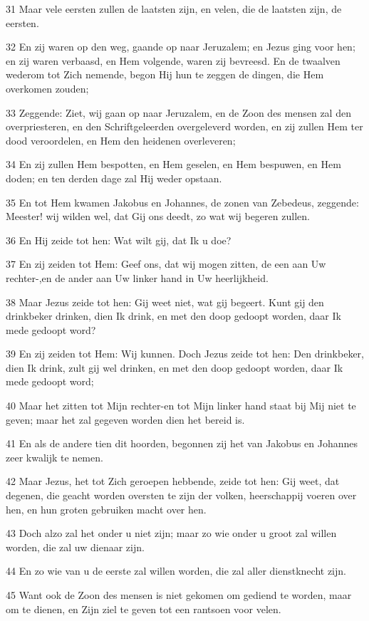 \par 31 Maar vele eersten zullen de laatsten zijn, en velen, die de laatsten zijn, de eersten.
\par 32 En zij waren op den weg, gaande op naar Jeruzalem; en Jezus ging voor hen; en zij waren verbaasd, en Hem volgende, waren zij bevreesd. En de twaalven wederom tot Zich nemende, begon Hij hun te zeggen de dingen, die Hem overkomen zouden;
\par 33 Zeggende: Ziet, wij gaan op naar Jeruzalem, en de Zoon des mensen zal den overpriesteren, en den Schriftgeleerden overgeleverd worden, en zij zullen Hem ter dood veroordelen, en Hem den heidenen overleveren;
\par 34 En zij zullen Hem bespotten, en Hem geselen, en Hem bespuwen, en Hem doden; en ten derden dage zal Hij weder opstaan.
\par 35 En tot Hem kwamen Jakobus en Johannes, de zonen van Zebedeus, zeggende: Meester! wij wilden wel, dat Gij ons deedt, zo wat wij begeren zullen.
\par 36 En Hij zeide tot hen: Wat wilt gij, dat Ik u doe?
\par 37 En zij zeiden tot Hem: Geef ons, dat wij mogen zitten, de een aan Uw rechter-,en de ander aan Uw linker hand in Uw heerlijkheid.
\par 38 Maar Jezus zeide tot hen: Gij weet niet, wat gij begeert. Kunt gij den drinkbeker drinken, dien Ik drink, en met den doop gedoopt worden, daar Ik mede gedoopt word?
\par 39 En zij zeiden tot Hem: Wij kunnen. Doch Jezus zeide tot hen: Den drinkbeker, dien Ik drink, zult gij wel drinken, en met den doop gedoopt worden, daar Ik mede gedoopt word;
\par 40 Maar het zitten tot Mijn rechter-en tot Mijn linker hand staat bij Mij niet te geven; maar het zal gegeven worden dien het bereid is.
\par 41 En als de andere tien dit hoorden, begonnen zij het van Jakobus en Johannes zeer kwalijk te nemen.
\par 42 Maar Jezus, het tot Zich geroepen hebbende, zeide tot hen: Gij weet, dat degenen, die geacht worden oversten te zijn der volken, heerschappij voeren over hen, en hun groten gebruiken macht over hen.
\par 43 Doch alzo zal het onder u niet zijn; maar zo wie onder u groot zal willen worden, die zal uw dienaar zijn.
\par 44 En zo wie van u de eerste zal willen worden, die zal aller dienstknecht zijn.
\par 45 Want ook de Zoon des mensen is niet gekomen om gediend te worden, maar om te dienen, en Zijn ziel te geven tot een rantsoen voor velen.
